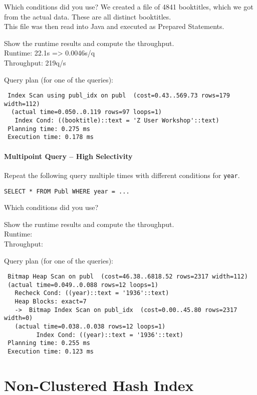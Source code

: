 \documentclass[11pt]{scrartcl}
\begin{document}
\noindent
Which conditions did you use?
We created a file of 4841 booktitles, which we got from the actual data. These are all distinct booktitles.\\
This file was then read into Java and executed as Prepared Statements.

\smallskip\noindent
Show the runtime results and compute the throughput.\\
Runtime: 22.1s => 0.0046s/q\\
Throughput: 219q/s

\smallskip\noindent
Query plan (for one of the queries):
{\small
\begin{verbatim}
 Index Scan using publ_idx on publ  (cost=0.43..569.73 rows=179 width=112)
  (actual time=0.050..0.119 rows=97 loops=1)
   Index Cond: ((booktitle)::text = 'Z User Workshop'::text)
 Planning time: 0.275 ms
 Execution time: 0.178 ms
\end{verbatim}
}


\paragraph{Multipoint Query -- High Selectivity}

Repeat the following query multiple times with different conditions for {\tt year}.

{\small
\begin{verbatim}
SELECT * FROM Publ WHERE year = ...
\end{verbatim}
}

\noindent
Which conditions did you use?

\smallskip\noindent
Show the runtime results and compute the throughput.\\
Runtime: \\
Throughput: 

\smallskip\noindent
Query plan (for one of the queries):
{\small
\begin{verbatim}
 Bitmap Heap Scan on publ  (cost=46.38..6818.52 rows=2317 width=112)
 (actual time=0.049..0.088 rows=12 loops=1)
   Recheck Cond: ((year)::text = '1936'::text)
   Heap Blocks: exact=7
   ->  Bitmap Index Scan on publ_idx  (cost=0.00..45.80 rows=2317 width=0)
   (actual time=0.038..0.038 rows=12 loops=1)
         Index Cond: ((year)::text = '1936'::text)
 Planning time: 0.255 ms
 Execution time: 0.123 ms

\end{verbatim}
}

\section{Non-Clustered Hash Index}
\end{document}
